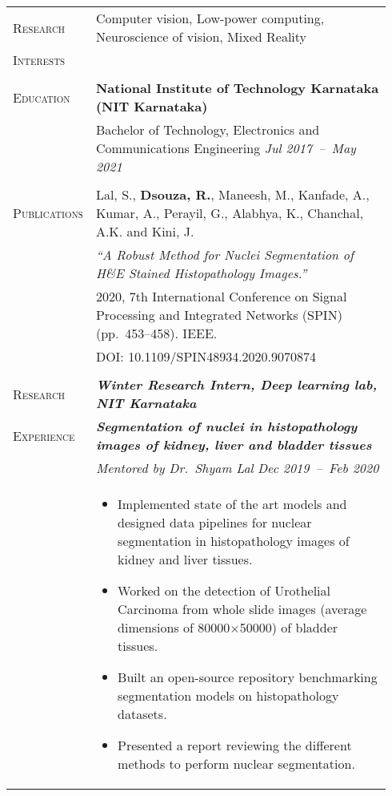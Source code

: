 \documentclass[letterpaper, 10pt, oneside]{article}
\newcommand{\stitle}[1]{\normalsize{\textsc{#1}}}
\newcommand{\bdit}[1]{\textit{\textbf{#1}}}
\begin{document}
\noindent \begin{longtable}{@{} p{0.14\linewidth} p{0.8\linewidth}}

\stitle{Research}  & Computer vision, Low-power computing, Neuroscience of vision, Mixed Reality \\
\stitle{Interests} & \\
\\


\stitle{Education} & \textbf{National Institute of Technology Karnataka (NIT Karnataka)} \\
                   & Bachelor of Technology, Electronics and Communications Engineering \hfill \hspace{-3em} \textit{Jul 2017\ --\ May 2021} \\
\\


\stitle{Publications} & Lal, S., \textbf{Dsouza, R.}, Maneesh, M., Kanfade, A., Kumar, A., Perayil, G., Alabhya, K., Chanchal, A.K. and Kini, J. \\
                      & \textit{``A Robust Method for Nuclei Segmentation of H\&E Stained Histopathology Images.''} \\
                      & 2020, 7th International Conference on Signal Processing and Integrated Networks (SPIN) (pp.~453--458)\@. IEEE\@.  \\
                      & \textcolor{dark-purple}{DOI\@: 10.1109/SPIN48934.2020.9070874} \\
\\


\stitle{Research}   & \bdit{Winter Research Intern, Deep learning lab, NIT Karnataka} \\
\stitle{Experience} & \bdit{Segmentation of nuclei in histopathology images of kidney, liver and bladder tissues} \\
                    & \textit{Mentored by Dr.\ Shyam Lal} \hfill \hspace{-3em} \textit{Dec 2019\ --\ Feb 2020} \\
                    & \parbox{0.8\textwidth}{%
                        \begin{itemize}[leftmargin=*, itemsep=-0.88ex, topsep=-0.88ex]
                            \item Implemented state of the art models and designed data pipelines for nuclear segmentation in histopathology images of kidney and liver tissues. 
                            \item Worked on the detection of Urothelial Carcinoma from whole slide images (average dimensions of 80000$\times$50000) of bladder tissues.
                            \item Built an open-source repository benchmarking segmentation models on histopathology datasets.
                            \item Presented a report reviewing the different methods to perform nuclear segmentation.
                        \end{itemize}
                    }
\\
\\


\end{longtable}
\end{document}

